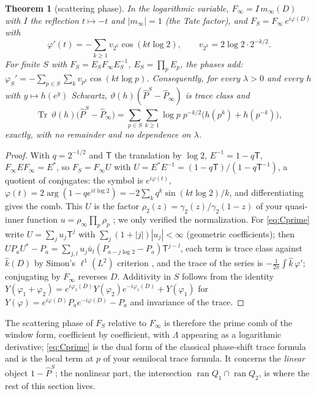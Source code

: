 \documentclass[11pt]{amsart}
\newtheorem{theorem}{Theorem}[section]
\theoremstyle{definition}
\theoremstyle{remark}
\newcommand{\Tr}{\operatorname{Tr}}
\newcommand{\ran}{\operatorname{ran}}
\newcommand{\Pih}{\widehat P}
\begin{document}
\begin{theorem}[scattering phase]\label{thm:phase}
In the logarithmic variable, $F_\infty=I\,m_\infty(D)$ with $I$ the reflection $t\mapsto-t$ and $|m_\infty|=1$ (the Tate
factor), and $F_S=F_\infty\,e^{i\varphi(D)}$ with
\[
\varphi'(t)=-\sum_{k\ge1}v_{2^k}\cos(kt\log2),\qquad v_{2^k}=2\log2\cdot2^{-k/2}.
\]
For finite $S$ with $F_S=E_SF_\infty E_S^{-1}$, $E_S=\prod_pE_p$, the phases add: $\varphi_S'=-\sum_{p\in S}\sum_kv_{p^k}\cos(kt\log p)$.
Consequently, for every $\lambda>0$ and every $h$ with $y\mapsto h(e^y)$ Schwartz, $\vartheta(h)(\Pih^S-\Pih_\infty)$ is trace class and
\begin{equation}\label{eq:Cprime}
\Tr\,\vartheta(h)\big(\Pih^S-\Pih_\infty\big)=\sum_{p\in S}\sum_{k\ge1}\log p\;p^{-k/2}\big(h(p^k)+h(p^{-k})\big),
\end{equation}
exactly, with no remainder and no dependence on $\lambda$.
\end{theorem}
\begin{proof}
With $q=2^{-1/2}$ and $\mathsf T$ the translation by $\log2$, $E^{-1}=1-q\mathsf T$, $F_\infty EF_\infty=E^*$, so
$F_S=F_\infty U$ with $U=E^*E^{-1}=(1-q\mathsf T)/(1-q\mathsf T^{-1})$, a quotient of conjugates: the symbol is
$e^{i\varphi(t)}$, $\varphi(t)=2\arg(1-qe^{it\log2})=-2\sum_kq^k\sin(kt\log2)/k$, and differentiating gives the comb. This $U$ is
the factor $\rho_2(z)=\gamma_2(z)/\gamma_2(1-z)$ of your quasi-inner function $u=\rho_\infty\prod_p\rho_p$
\cite[Lemma~3.1]{CCquasi}; we only verified the normalization. For \eqref{eq:Cprime} write $U=\sum_ju_j\mathsf T^{j}$ with
$\sum_j(1+|j|)|u_j|<\infty$ (geometric coefficients); then $UP_aU^*-P_a=\sum_{j,l}u_j\bar u_l(P_{a-j\log2}-P_a)\mathsf T^{j-l}$,
each term is trace class against $\widehat k(D)$ by Simon's $\ell^1(L^2)$ criterion \cite[Thm.~4.5]{Simon}, and the trace of the
series is $-\frac1{2\pi}\int\widehat k\,\varphi'$; conjugating by $F_\infty$ reverses $D$. Additivity in $S$ follows from the
identity $Y(\varphi_1+\varphi_2)=e^{i\varphi_1(D)}Y(\varphi_2)e^{-i\varphi_1(D)}+Y(\varphi_1)$ for
$Y(\varphi)=e^{i\varphi(D)}P_ae^{-i\varphi(D)}-P_a$ and invariance of the trace.
\end{proof}

The scattering phase of $F_S$ relative to $F_\infty$ is therefore the prime comb of the window form, coefficient by
coefficient, with $\Lambda$ appearing as a logarithmic derivative; \eqref{eq:Cprime} is the dual form of the classical
phase-shift trace formula and is the local term at $p$ of your semilocal trace formula. It concerns the \emph{linear}
object $1-\Pih^S$; the nonlinear part, the intersection $\ran Q_1\cap\ran Q_2$, is where the rest of this section lives.
\end{document}

